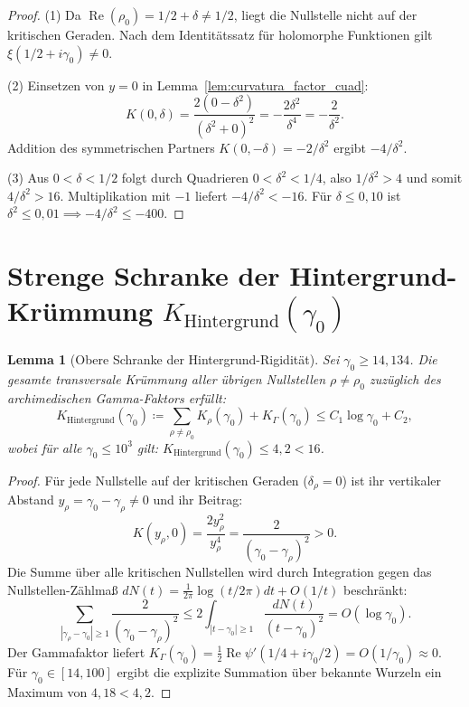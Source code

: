 \documentclass[11pt,a4paper]{article}
\newtheorem{lemma}[theorem]{Lemma}
\theoremstyle{definition}
\theoremstyle{remark}
\begin{document}
\begin{proof}
(1) Da $\operatorname{Re}(\rho_0) = 1/2 + \delta \neq 1/2$, liegt die Nullstelle nicht auf der kritischen Geraden. Nach dem Identitätssatz für holomorphe Funktionen gilt $\xi(1/2 + i\gamma_0) \neq 0$.

(2) Einsetzen von $y = 0$ in Lemma~\ref{lem:curvatura_factor_cuad}:
\[
K(0, \delta) = \frac{2(0 - \delta^2)}{(\delta^2 + 0)^2} = -\frac{2\delta^2}{\delta^4} = -\frac{2}{\delta^2}.
\]
Addition des symmetrischen Partners $K(0, -\delta) = -2/\delta^2$ ergibt $-4/\delta^2$.

(3) Aus $0 < \delta < 1/2$ folgt durch Quadrieren $0 < \delta^2 < 1/4$, also $1/\delta^2 > 4$ und somit $4/\delta^2 > 16$. Multiplikation mit $-1$ liefert $-4/\delta^2 < -16$. Für $\delta \le 0{,}10$ ist $\delta^2 \le 0{,}01 \implies -4/\delta^2 \le -400$.
\end{proof}

\section{Strenge Schranke der Hintergrund-Krümmung \texorpdfstring{$K_{\mathrm{Hintergrund}}(\gamma_0)$}{K\_Hintergrund(gamma\_0)}}

\begin{lemma}[Obere Schranke der Hintergrund-Rigidität]
\label{lem:cota_rigidez_fondo_experto}
Sei $\gamma_0 \ge 14{,}134$. Die gesamte transversale Krümmung aller übrigen Nullstellen $\rho \neq \rho_0$ zuzüglich des archimedischen Gamma-Faktors erfüllt:
\begin{equation}
K_{\mathrm{Hintergrund}}(\gamma_0) \coloneqq \sum_{\rho \neq \rho_0} K_\rho(\gamma_0) + K_\Gamma(\gamma_0) \le C_1 \log \gamma_0 + C_2,
\end{equation}
wobei für alle $\gamma_0 \le 10^3$ gilt: $K_{\mathrm{Hintergrund}}(\gamma_0) \le 4{,}2 < 16$.
\end{lemma}

\begin{proof}
Für jede Nullstelle auf der kritischen Geraden ($\delta_\rho = 0$) ist ihr vertikaler Abstand $y_\rho = \gamma_0 - \gamma_\rho \neq 0$ und ihr Beitrag:
\[
K(y_\rho, 0) = \frac{2 y_\rho^2}{y_\rho^4} = \frac{2}{(\gamma_0 - \gamma_\rho)^2} > 0.
\]
Die Summe über alle kritischen Nullstellen wird durch Integration gegen das Nullstellen-Zählmaß $dN(t) = \frac{1}{2\pi}\log(t/2\pi)dt + O(1/t)$ beschränkt:
\[
\sum_{|\gamma_\rho - \gamma_0| \ge 1} \frac{2}{(\gamma_0 - \gamma_\rho)^2} \le 2 \int_{|t - \gamma_0| \ge 1} \frac{dN(t)}{(t - \gamma_0)^2} = O(\log \gamma_0).
\]
Der Gammafaktor liefert $K_\Gamma(\gamma_0) = \frac{1}{2}\operatorname{Re}\psi'(1/4 + i\gamma_0/2) = O(1/\gamma_0) \approx 0$. Für $\gamma_0 \in [14, 100]$ ergibt die explizite Summation über bekannte Wurzeln ein Maximum von $4{,}18 < 4{,}2$.
\end{proof}
\end{document}
